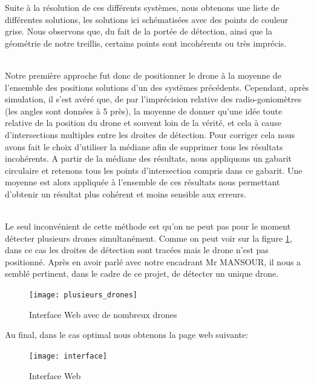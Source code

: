   Suite à la résolution de ces différents systèmes, nous
obtenons une liste de différentes solutions, les solutions ici
schématisées avec des points de couleur grise. Nous observons
que, du fait de la portée de détection, ainsi que la géométrie
de notre treillis, certains points sont incohérents ou très
imprécis.

~\\
Notre première approche fut donc de positionner le drone à
la moyenne de l’ensemble des positions solutions d’un des
systèmes précédents. Cependant, après simulation, il s’est
avéré que, de par l’imprécision relative des
radio-goniomètres (les angles sont données à 5 près), la moyenne de donner qu’une idée toute relative de la position du drone et souvent loin de la vérité, et
cela à cause d’intersections multiples entre les droites de détection.
Pour corriger cela nous avons fait le choix d’utiliser la médiane afin de supprimer tous les résultats
incohérents. A partir de la médiane des résultats, nous appliquons un gabarit circulaire et retenons
tous les points d’intersection compris dans ce gabarit. Une moyenne est alors appliquée à l’ensemble
de ces résultats nous permettant d’obtenir un résultat plus cohérent et moins sensible aux erreurs.


~\\

Le seul inconvénient de cette méthode est qu'on ne peut pas pour le moment détecter plusieurs drones simultanément. Comme on peut voir sur la figure \ref{fig:plusieursdrones}, dans ce cas les droites de détection sont tracées mais le drone n'est pas positionné. Après en avoir parlé avec notre encadrant Mr MANSOUR, il nous a semblé pertinent, dans le cadre de ce projet, de détecter un unique drone.

\begin{figure}[h]
  \centering
  \texttt{[image: plusieurs\_drones]}
  \caption{Interface Web avec de nombreux drones}
  \label{fig:plusieursdrones}
\end{figure}

\newpage
Au final, dans le cas optimal nous obtenons la page web suivante:

\begin{figure}[!h]
  \centering
  \texttt{[image: interface]}
  \caption{Interface Web}
  \label{fig:interface}
\end{figure}





